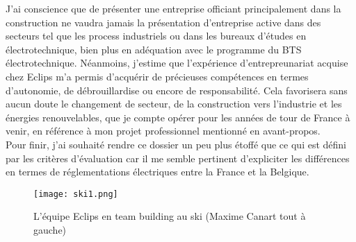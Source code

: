 \documentclass[a4paper, 12pt]{article}
\begin{document}
J'ai conscience que de présenter une entreprise officiant principalement dans la construction ne vaudra jamais la présentation d'entreprise active dans des secteurs tel que les process industriels ou dans les bureaux d'études en électrotechnique, bien plus en adéquation avec le programme du BTS électrotechnique. Néanmoins, j'estime que l'expérience d'entrepreunariat acquise chez Eclips m'a permis d'acquérir de précieuses compétences en termes d'autonomie, de débrouillardise ou encore de responsabilité. Cela favorisera sans aucun doute le changement de secteur, de la construction vers l'industrie et les énergies renouvelables, que je compte opérer pour les années de tour de France à venir, en référence à mon projet professionnel mentionné en avant-propos.\\

Pour finir, j'ai souhaité rendre ce dossier un peu plus étoffé que ce qui est défini par les critères d'évaluation car il me semble pertinent d'expliciter les différences en termes de réglementations électriques entre la France et la Belgique.\\

\begin{figure}[h!]
	\texttt{[image: ski1.png]}
		\centering
		\caption{L'équipe Eclips en team building au ski (Maxime Canart tout à gauche)}
\end{figure}

\newpage

\setcounter{section}{0} 

\appendixpage
   \renewcommand{\appendixname}{Annexes}
\end{document}
